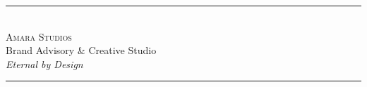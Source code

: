 \documentclass[11pt,a4paper]{article}
\begin{document}
\vspace{3em}

\begin{center}
{\textcolor{amaraprimary}{\rule{0.4\textwidth}{1.5pt}}}\\[1.2em]
{\large\textcolor{amaraprimary}{\textsc{Amara Studios}}}\\[0.4em]
{\small\textcolor{amaradark}{Brand Advisory \& Creative Studio}}\\[0.3em]
{\small\textit{\textcolor{amarasecondary}{Eternal by Design}}}\\[1.2em]
{\textcolor{amaraprimary}{\rule{0.4\textwidth}{1.5pt}}}
\end{center}
\end{document}
